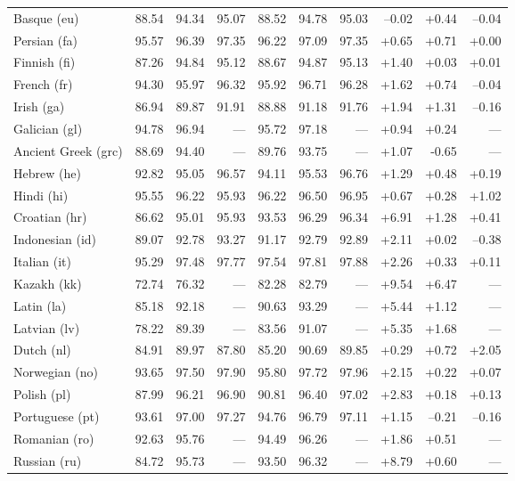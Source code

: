 \documentclass[11pt,a4paper]{article}
\begin{document}
\begin{table}[t]
\begin{tabular}{l|rrr|rrr|rrr}
Basque (eu) & 88.54 & 94.34 & 95.07 & 88.52 & 94.78 & 95.03 & --0.02 & +0.44 & --0.04\\
Persian (fa) & 95.57 & 96.39 & 97.35 & 96.22 & 97.09 & 97.35 & +0.65 & +0.71 & +0.00\\
Finnish (fi) & 87.26 & 94.84 & 95.12 & 88.67 & 94.87 & 95.13 & +1.40 & +0.03 & +0.01\\
French (fr) & 94.30 & 95.97 & 96.32 & 95.92 & 96.71 & 96.28 & +1.62 & +0.74 & --0.04\\
Irish (ga) & 86.94 & 89.87 & 91.91 & 88.88 & 91.18 & 91.76 & +1.94 & +1.31 & --0.16\\
Galician (gl) & 94.78 & 96.94 & --- & 95.72 & 97.18 & --- & +0.94 & +0.24 & ---\\
Ancient Greek (grc) & 88.69 & 94.40 & --- & 89.76 & 93.75 & --- & +1.07 & -0.65 & ---\\
Hebrew (he) & 92.82 & 95.05 & 96.57 & 94.11 & 95.53 & 96.76 & +1.29 & +0.48 & +0.19\\
Hindi (hi) & 95.55 & 96.22 & 95.93 & 96.22 & 96.50 & 96.95 & +0.67 & +0.28 & +1.02\\
Croatian (hr) & 86.62 & 95.01 & 95.93 & 93.53 & 96.29 & 96.34 & +6.91 & +1.28 & +0.41\\
Indonesian (id) & 89.07 & 92.78 & 93.27 & 91.17 & 92.79 & 92.89 & +2.11 & +0.02 & --0.38\\
Italian (it) & 95.29 & 97.48 & 97.77 & 97.54 & 97.81 & 97.88 & +2.26 & +0.33 & +0.11\\
Kazakh (kk) & 72.74 & 76.32 & --- & 82.28 & 82.79 & --- & +9.54 & +6.47 & ---\\
Latin (la) & 85.18 & 92.18 & --- & 90.63 & 93.29 & --- & +5.44 & +1.12 & ---\\
Latvian (lv) & 78.22 & 89.39 & --- & 83.56 & 91.07 & --- & +5.35 & +1.68 & ---\\
Dutch (nl) & 84.91 & 89.97 & 87.80 & 85.20 & 90.69 & 89.85 & +0.29 & +0.72 & +2.05\\
Norwegian (no) & 93.65 & 97.50 & 97.90 & 95.80 & 97.72 & 97.96 & +2.15 & +0.22 & +0.07\\
Polish (pl) & 87.99 & 96.21 & 96.90 & 90.81 & 96.40 & 97.02 & +2.83 & +0.18 & +0.13\\
Portuguese (pt) & 93.61 & 97.00 & 97.27 & 94.76 & 96.79 & 97.11 & +1.15 & --0.21 & --0.16\\
Romanian (ro) & 92.63 & 95.76 & --- & 94.49 & 96.26 & --- & +1.86 & +0.51 & ---\\
Russian (ru) & 84.72 & 95.73 & --- & 93.50 & 96.32 & --- & +8.79 & +0.60 & ---\\

\end{tabular}
\end{table}
\end{document}
